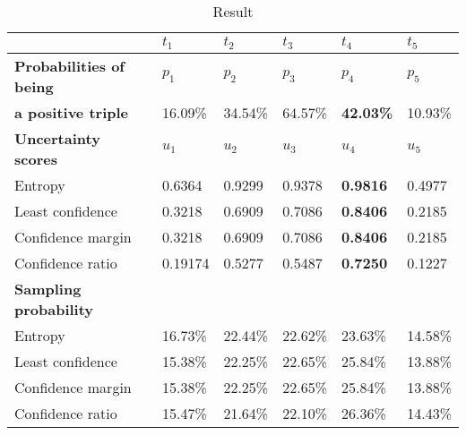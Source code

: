 \begin{table}[h]
    \centering
    \begin{tabular}{llllll}
        \toprule
        
        &  \textbf{$t_1$} & \textbf{$t_2$} & \textbf{$t_3$} & \textbf{$t_4$} & \textbf{$t_5$} \\
         
        \midrule
        
        \textbf{Probabilities of being}
         & $p_1$ & $p_2$ & $p_3$ & $p_4$ & $p_5$   \\
         
        \textbf{a positive triple}
        & 16.09\% 
        & 34.54\% 
        & 64.57\%
        & \textbf{42.03\%} 
        & 10.93\%  \\
        
        
        \midrule
        \textbf{Uncertainty scores}
         & $u_1$ & $u_2$ & $u_3$ & $u_4$ & $u_5$ \\
        
        Entropy 
        & 0.6364 & 0.9299 & 0.9378 & \textbf{0.9816} & 0.4977 \\
        
        Least confidence 
        & 0.3218 & 0.6909 & 0.7086 & \textbf{0.8406} & 0.2185 \\
        
        Confidence margin
        & 0.3218 & 0.6909 & 0.7086 & \textbf{0.8406} & 0.2185 \\
        
        Confidence ratio
        & 0.19174 & 0.5277 & 0.5487 & \textbf{0.7250} & 0.1227\\
        
        \midrule
        \textbf{Sampling probability}
        & & & & & \\
        
        Entropy 
        & 16.73\% & 22.44\% & 22.62\% & 23.63\% & 14.58\% \\
        
        Least confidence 
        & 15.38\% & 22.25\% & 22.65\% & 25.84\% & 13.88\% \\
       
        Confidence margin
        & 15.38\% & 22.25\% & 22.65\% & 25.84\% & 13.88\% \\
        
        Confidence ratio
        & 15.47\% & 21.64\% & 22.10\% & 26.36\% & 14.43\% \\
        
        \bottomrule
    \end{tabular}
    \caption{Result}
\label{tab:uncertainty_measure_example_distribution}
\end{table}
